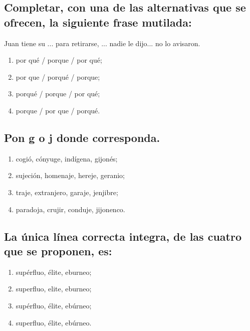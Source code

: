 \documentclass[12pt, a4paper, oneside]{report}
\begin{document}
            \subsection{Completar, con una de las alternativas que se ofrecen, la siguiente frase mutilada:}
                Juan tiene su ... para retirarse, ... nadie le dijo... no lo avisaron.
                \begin{enumerate}
                    \item por qué / porque / por qué;
                    \item por que / porqué / porque;
                    \item \color{verde}porqué / porque / por qué\color{negro};
                    \item porque / por que / porqué.
                \end{enumerate}
            \subsection{Pon g o j donde corresponda.}
                \begin{enumerate}
                    \item co\color{verde}g\color{negro}ió, cónyu\color{verde}g\color{negro}e,
                    indí\color{verde}g\color{negro}ena, \color{verde}g\color{negro}ijonés;
                    \item su\color{verde}j\color{negro}eción, homena\color{verde}j\color{negro}e,
                    here\color{verde}j\color{negro}e, \color{verde}g\color{negro}eranio;
                    \item tra\color{verde}j\color{negro}e, extran\color{verde}j\color{negro}ero,
                    gara\color{verde}j\color{negro}e, jen\color{verde}j\color{negro}ibre;
                    \item parado\color{verde}j\color{negro}a, cru\color{verde}j\color{negro}ir,
                    condu\color{verde}j\color{negro}e, \color{verde}j\color{negro}ijonenco.
                \end{enumerate}
            \subsection{La única línea correcta integra, de las cuatro que se proponen, es:}
                \begin{enumerate}
                    \item supérfluo, élite, eburneo;
                    \item superfluo, elite, eburneo;
                    \item supérfluo, élite, ebúrneo;
                    \item \color{verde}superfluo, élite, ebúrneo\color{negro}.
                \end{enumerate}
\end{document}
